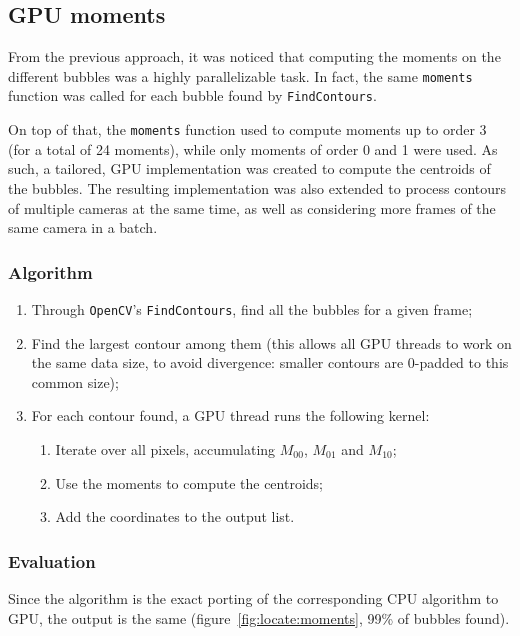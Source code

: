 \subsection{GPU moments}
\label{sec:locate:gpu-moments}

From the previous approach, it was noticed that computing the moments on the different bubbles was a highly parallelizable task.
In fact, the same \texttt{moments} function was called for each bubble found by \texttt{FindContours}.

On top of that, the \texttt{moments} function used to compute moments up to order 3 (for a total of 24 moments), while only moments of order 0 and 1 were used.
As such, a tailored, GPU implementation was created to compute the centroids of the bubbles.
The resulting implementation was also extended to process contours of multiple cameras at the same time,  as well as considering more frames of the same camera in a batch.

\subsubsection{Algorithm}

\begin{enumerate}
	\itemsep 0em
	\item Through \texttt{OpenCV}'s \texttt{FindContours}, find all the bubbles for a given frame;
	\item Find the largest contour among them (this allows all GPU threads to work on the same data size, to avoid divergence: smaller contours are 0-padded to this common size);
	\item For each contour found, a GPU thread runs the following kernel:
	      \begin{enumerate}
		      \item Iterate over all pixels, accumulating $M_{00}$, $M_{01}$ and $M_{10}$;
		      \item Use the moments to compute the centroids;
		      \item Add the coordinates to the output list.
	      \end{enumerate}
\end{enumerate}

\subsubsection{Evaluation}

Since the algorithm is the exact porting of the corresponding CPU algorithm to GPU, the output is the same (figure~\ref{fig:locate:moments}, 99\% of bubbles found).

